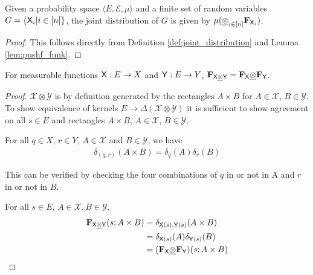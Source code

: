 \begin{lemma}\label{lem:rvg_jd}
Given a probability space $\langle E,\mathcal{E},\mu \rangle$ and a finite set of random variables $G = \{\mathsf{X}_i|i\in [n]\}$, the joint distribution of $G$ is given by $\mu (\underline{\otimes}_{i\in [n]} \mathbf{F}_{\mathsf{X}_i})$.
\end{lemma}

\begin{proof}
This follows directly from Definition \ref{def:joint_distribution} and Lemma \ref{lem:pushf_funk}.
\end{proof}

\begin{lemma}\label{lem:thing_commutes}
For measurable functions $\mathsf{X}:E\to X$ and $\mathsf{Y}:E\to Y$, $\mathbf{F}_{\mathsf{X}\underline{\otimes}\mathsf{Y}}=\mathbf{F}_{\mathsf{X}}\underline{\otimes}\mathbf{F}_{\mathsf{Y}}$.
\end{lemma}

\begin{proof}
$\mathcal{X}\otimes\mathcal{Y}$ is by definition generated by the rectangles $A\times B$ for $A\in\mathcal{X}$, $B\in \mathcal{Y}$. To show equivalence of kernels $E\to \Delta(\mathcal{X}\otimes\mathcal{Y})$ it is sufficient to show agreement on all $s\in E$ and rectangles $A\times B$, $A\in \mathcal{X}$, $B\in \mathcal{Y}$.

For all $q\in X$, $r\in Y$, $A\in\mathcal{X}$ and $B\in \mathcal{Y}$, we have
\begin{align}
	\delta_{(q,r)}(A\times B) = \delta_q (A) \delta_r (B)
\end{align}

This can be verified by checking the four combinations of $q$ in or not in A and $r$ in or not in $B$.

For all $s\in E$, $A\in\mathcal{X},B\in\mathcal{Y}$,
\begin{align}
	\mathbf{F}_{\mathsf{X}\underline{\otimes}\mathsf{Y}}(s;A\times B) &= \delta_{\mathsf{X}(s),\mathsf{Y}(s)}(A\times B)\\
												  &= \delta_{\mathsf{X}(s)}(A)\delta_{\mathsf{Y}(s)}(B)\\
												  &= (\mathbf{F}_{\mathsf{X}}\underline{\otimes} \mathbf{F}_{\mathsf{Y}})(s;A\times B)
\end{align}
\end{proof}

